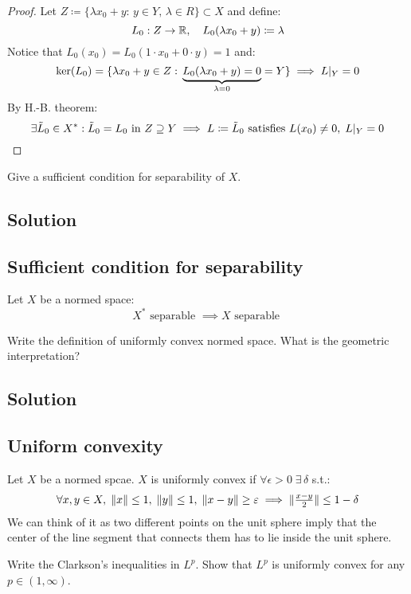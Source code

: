 \begin{proof}
Let $Z \coloneqq \{\lambda x_0 + y:\,y\in Y,\,\lambda \in R\} \subset X$ and define:
\[
L_0: Z\to\R,\quad L_0(\lambda x_0 + y) \coloneqq \lambda
\]
Notice that $L_0(x_0) = L_0(1\cdot x_0+0\cdot y) = 1$ and:
\[
\ker(L_0)= \{\lambda x_0 + y \in Z :\,\underbrace{L_0(\lambda x_0 + y)=0}_{\lambda=0}=Y\} \implies L\arrowvert_Y=0
\]
By H.-B. theorem: 
\[
\exists \Tilde{L}_0 \in X^*: \Tilde{L}_0 = L_0\text{ in }Z \supseteq Y \implies L \coloneqq \Tilde{L}_0 \text{ satisfies } L(x_0)  \neq 0,\;  L\arrowvert_Y=0
\]
\end{proof}


\question
Give a sufficient condition for separability of $X$.

\subsection*{Solution}

\subsection{Sufficient condition for separability}
Let $X$ be a normed space:\[
X^* \text{ separable } \implies X \text{ separable }
\]


\question
Write the definition of uniformly convex normed space. What is the geometric interpretation?

\subsection*{Solution}

\subsection{Uniform convexity}
Let $X$ be a normed spcae.
$X$ is uniformly convex if $\forall \epsilon >0 \;\exists \,\delta$ s.t.:\[
\forall x,y\in X,\;\|x\|\le 1,\;\|y\|\le 1,\;\|x-y\|\ge \epsilon \implies \|\tfrac{x-y}{2}\|\le 1-\delta \\[0pt]
\]We can think of it as two different points on the unit sphere imply that the center of the line segment that connects them has to lie inside the unit sphere.


\question
Write the Clarkson's inequalities in $L^p$. Show that $L^p$ is uniformly convex for any $ p \in(1, \infty)$.

